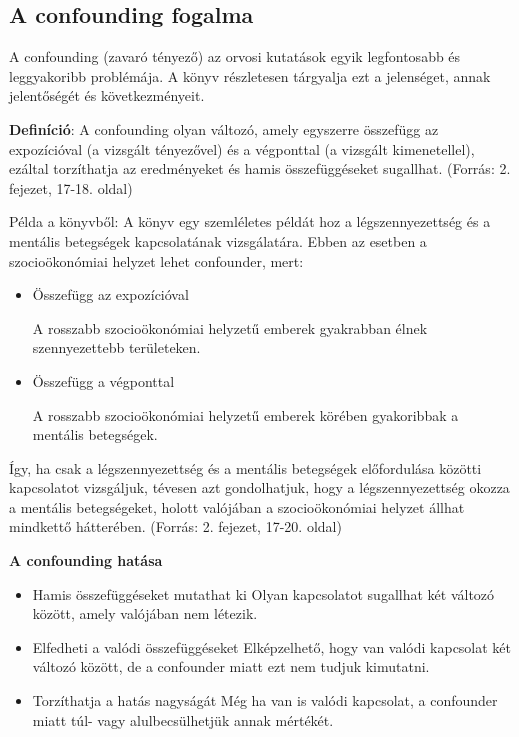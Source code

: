 \documentclass[a4paper,12pt]{article}
\begin{document}
\subsection{A confounding fogalma}

A confounding (zavaró tényező) az orvosi kutatások egyik legfontosabb és leggyakoribb problémája. A könyv részletesen tárgyalja ezt a jelenséget, annak jelentőségét és következményeit.

\textbf{Definíció}: A confounding olyan változó, amely egyszerre összefügg az expozícióval (a vizsgált tényezővel) és a végponttal (a vizsgált kimenetellel), ezáltal torzíthatja az eredményeket és hamis összefüggéseket sugallhat. (Forrás: 2. fejezet, 17-18. oldal)

Példa a könyvből: A könyv egy szemléletes példát hoz a légszennyezettség és a mentális betegségek kapcsolatának vizsgálatára. Ebben az esetben a szocioökonómiai helyzet lehet confounder, mert:

\begin{itemize}

\item Összefügg az expozícióval

A rosszabb szocioökonómiai helyzetű emberek gyakrabban élnek szennyezettebb területeken.

\item Összefügg a végponttal

A rosszabb szocioökonómiai helyzetű emberek körében gyakoribbak a mentális betegségek.

\end{itemize}

Így, ha csak a légszennyezettség és a mentális betegségek előfordulása közötti kapcsolatot vizsgáljuk, tévesen azt gondolhatjuk, hogy a légszennyezettség okozza a mentális betegségeket, holott valójában a szocioökonómiai helyzet állhat mindkettő hátterében. (Forrás: 2. fejezet, 17-20. oldal)

\textbf{A confounding hatása}

\begin{itemize}

\item Hamis összefüggéseket mutathat ki
Olyan kapcsolatot sugallhat két változó között, amely valójában nem létezik.


\item Elfedheti a valódi összefüggéseket
Elképzelhető, hogy van valódi kapcsolat két változó között, de a confounder miatt ezt nem tudjuk kimutatni.


\item Torzíthatja a hatás nagyságát
Még ha van is valódi kapcsolat, a confounder miatt túl- vagy alulbecsülhetjük annak mértékét.
\end{itemize}
\end{document}

